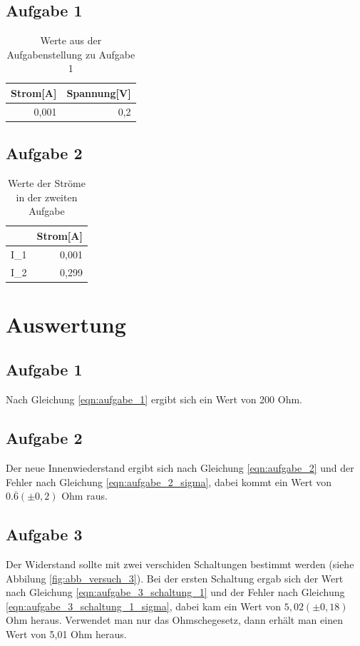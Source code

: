 \documentclass[12pt]{scrartcl}
\begin{document}
\subsection{Aufgabe 1}
\begin{table}[htbp]
\caption{Werte aus der Aufgabenstellung zu Aufgabe 1}
\begin{tabular}{|l|l|}
\hline
Strom[A] & Spannung[V] \\ \hline
\multicolumn{1}{|r|}{0,001} & \multicolumn{1}{r|}{0,2} \\ \hline
\end{tabular}
\label{aufgabe_1_grundwerte}
\end{table}

\subsection{Aufgabe 2}
\begin{table}[htbp]
\caption{Werte der Ströme in der zweiten Aufgabe}
\begin{tabular}{|l|r|}
\hline
 & \multicolumn{1}{l|}{Strom[A]} \\ \hline
I\_1 & 0,001 \\ \hline
I\_2 & 0,299 \\ \hline
\end{tabular}
\label{aufgabe_2_strom}
\end{table}



\section{Auswertung}

\subsection{Aufgabe 1}
Nach Gleichung \ref{eqn:aufgabe_1} ergibt sich ein Wert von 200 Ohm.

\subsection{Aufgabe 2}
Der neue Innenwiederstand ergibt sich nach Gleichung \ref{eqn:aufgabe_2} und der Fehler nach Gleichung \ref{eqn:aufgabe_2_sigma}, dabei kommt ein Wert von $0.\overline{6}(\pm 0,2)$ Ohm raus.

\subsection{Aufgabe 3}
Der Widerstand sollte mit zwei verschiden Schaltungen bestimmt werden (siehe Abbilung \ref{fig:abb_versuch_3}).
Bei der ersten Schaltung ergab sich der Wert nach Gleichung \ref{eqn:aufgabe_3_schaltung_1} und der Fehler nach Gleichung \ref{eqn:aufgabe_3_schaltung_1_sigma}, dabei kam ein Wert von $5,02	(\pm 0,18)$ Ohm heraus.
Verwendet man nur das Ohmschegesetz, dann erhält man einen Wert von 5,01 Ohm heraus.
\end{document}

